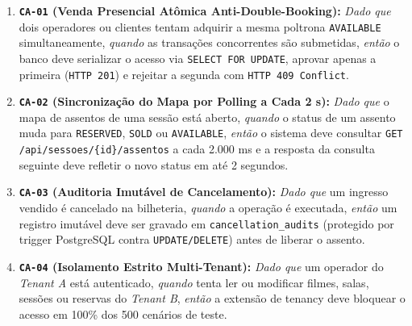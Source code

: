 \begin{enumerate}
\item \textbf{\texttt{CA-01} (Venda Presencial Atômica Anti-Double-Booking):} \emph{Dado que} dois operadores ou clientes tentam adquirir a mesma poltrona \texttt{AVAILABLE} simultaneamente, \emph{quando} as transações concorrentes são submetidas, \emph{então} o banco deve serializar o acesso via \texttt{SELECT \allowbreak\hspace{0pt plus 1pt}FOR \allowbreak\hspace{0pt plus 1pt}UPDATE}, aprovar apenas a primeira (\texttt{HTTP 201}) e rejeitar a segunda com \texttt{HTTP \allowbreak\hspace{0pt plus 1pt}409 \allowbreak\hspace{0pt plus 1pt}Conflict}.
\item \textbf{\texttt{CA-02} (Sincronização do Mapa por Polling a Cada 2 s):} \emph{Dado que} o mapa de assentos de uma sessão está aberto, \emph{quando} o status de um assento muda para \texttt{RESERVED}, \texttt{SOLD} ou \texttt{AVAILABLE}, \emph{então} o sistema deve consultar \texttt{GET \allowbreak\hspace{0pt plus 1pt}/\allowbreak\hspace{0pt plus 1pt}api/\allowbreak\hspace{0pt plus 1pt}sessoes/\allowbreak\hspace{0pt plus 1pt}\{id\}/\allowbreak\hspace{0pt plus 1pt}assentos} a cada 2.000 ms e a resposta da consulta seguinte deve refletir o novo status em até 2 segundos.
\item \textbf{\texttt{CA-03} (Auditoria Imutável de Cancelamento):} \emph{Dado que} um ingresso vendido é cancelado na bilheteria, \emph{quando} a operação é executada, \emph{então} um registro imutável deve ser gravado em \texttt{cancellation\_\allowbreak\hspace{0pt plus 1pt}audits} (protegido por trigger PostgreSQL contra \texttt{UPDATE/\allowbreak\hspace{0pt plus 1pt}DELETE}) antes de liberar o assento.
\item \textbf{\texttt{CA-04} (Isolamento Estrito Multi-Tenant):} \emph{Dado que} um operador do \emph{Tenant A} está autenticado, \emph{quando} tenta ler ou modificar filmes, salas, sessões ou reservas do \emph{Tenant B}, \emph{então} a extensão de tenancy deve bloquear o acesso em 100\% dos 500 cenários de teste.

\end{enumerate}

